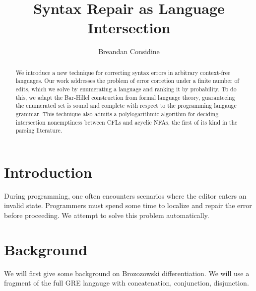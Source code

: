 \documentclass[sigplan,review,acmsmall,nonacm,screen,anonymous]{acmart}\settopmatter{printfolios=false,printccs=false,printacmref=false}
\begin{document}
%
  \title{Syntax Repair as Language Intersection}
  \begin{abstract}
    We introduce a new technique for correcting syntax errors in arbitrary context-free languages. Our work addresses the problem of error corretion under a finite number of edits, which we solve by enumerating a language and ranking it by probability. To do this, we adapt the Bar-Hillel construction from formal language theory, guaranteeing the enumerated set is sound and complete with respect to the programming langauge grammar. This technique also admits a polylogarithmic algorithm for deciding intersection nonemptiness between CFLs and acyclic NFAs, the first of its kind in the parsing literature.
  \end{abstract}

  \author{Breandan Considine}

  \maketitle

  \section{Introduction}

  During programming, one often encounters scenarios where the editor enters an invalid state. Programmers must spend some time to localize and repair the error before proceeding. We attempt to solve this problem automatically.

  \section{Background}

  We will first give some background on Brozozowski differentiation. We will use a fragment of the full GRE langauge with concatenation, conjunction, disjunction.
\end{document}
